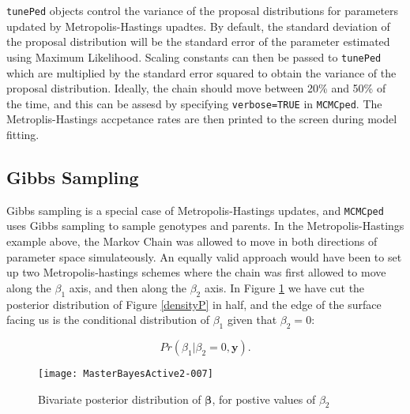 \documentclass{article}
\begin{document}
\texttt{tunePed} objects control the variance of the proposal distributions for parameters updated by Metropolis-Hastings upadtes.  By default, the standard deviation of the proposal distribution will be the standard error of the parameter estimated using Maximum Likelihood.  Scaling constants can then be passed to \texttt{tunePed} which are multiplied by the standard error squared to obtain the variance of the proposal distribution.  Ideally, the chain should move between 20\% and 50\% of the time, and this can be assesd by specifying \texttt{verbose=TRUE} in \texttt{MCMCped}.  The Metroplis-Hastings accpetance rates are then printed to the screen during model fitting.
 
\subsection{Gibbs Sampling}

Gibbs sampling is a special case of Metropolis-Hastings updates, and \texttt{MCMCped} uses Gibbs sampling to sample genotypes and parents.  In the Metropolis-Hastings example above, the Markov Chain was allowed to move in both directions of parameter space simulateously.  An equally valid approach would have been to set up two Metropolis-hastings schemes where the chain was first allowed to move along the $\beta_{1}$ axis, and then along the $\beta_{2}$ axis. In Figure \ref{densityPgibbs} we have cut the posterior distribution of Figure \ref{densityP} in half, and the edge of the surface facing us is the conditional distribution of $\beta_{1}$ given that $\beta_{2}=0$: 

\begin{equation}
Pr(\beta_{1}|\beta_{2}=0, \bm{y}).
\end{equation}

\begin{figure}[!h]
\begin{center}
\texttt{[image: MasterBayesActive2-007]}
\end{center}
\caption{Bivariate posterior distribution of $\bm{\beta}$, for postive values of $\beta_{2}$}
\label{densityPgibbs}
\end{figure}
\end{document}

